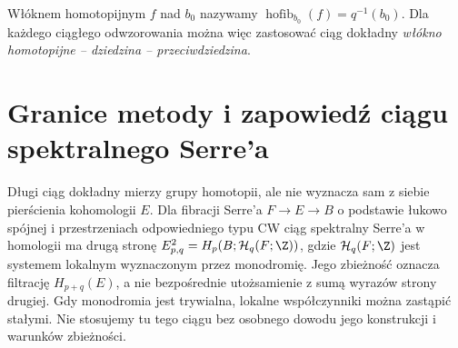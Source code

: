 Włóknem homotopijnym $f$ nad $b_0$ nazywamy
$\operatorname{hofib}_{b_0}(f)=q^{-1}(b_0)$.
Dla każdego ciągłego odwzorowania można więc zastosować ciąg dokładny
\emph{włókno homotopijne -- dziedzina -- przeciwdziedzina}.

\section{Granice metody i zapowiedź ciągu spektralnego Serre'a}
Długi ciąg dokładny mierzy grupy homotopii, ale nie wyznacza
sam z siebie pierścienia kohomologii $E$. Dla fibracji Serre'a
$F\to E\to B$ o podstawie łukowo spójnej i przestrzeniach
odpowiedniego typu CW ciąg spektralny Serre'a w homologii
ma drugą stronę
$E^2_{p,q}=H_p(B;\mathcal H_q(F;\Z))$,
gdzie $\mathcal H_q(F;\Z)$ jest systemem lokalnym wyznaczonym
przez monodromię. Jego zbieżność oznacza filtrację $H_{p+q}(E)$,
a nie bezpośrednie utożsamienie z sumą wyrazów strony drugiej.
Gdy monodromia jest trywialna, lokalne współczynniki można
zastąpić stałymi. Nie stosujemy tu tego ciągu bez osobnego
dowodu jego konstrukcji i warunków zbieżności.
\clearpage

